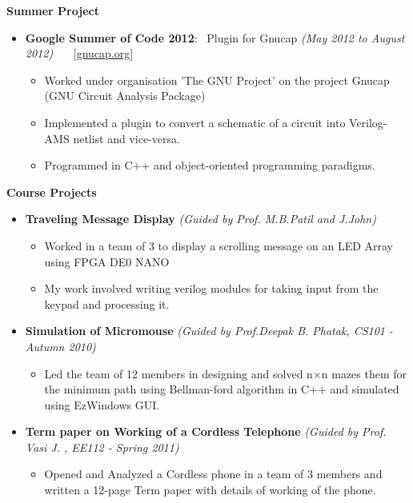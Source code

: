 \documentclass[a4paper,10pt]{article}
\newcommand{\isep}{-2 pt}
\newcommand{\resheading}[1]{{\small \colorbox{mygrey}{\begin{minipage}{0.975\textwidth}{\textbf{#1 \vphantom{p\^{E}}}}\end{minipage}}}}
\begin{document}
\resheading{\textbf{\large Summer Project}}
\begin{itemize}
    \item \textbf{Google Summer of Code 2012}: \ Plugin for Gnucap \emph{(May 2012 to August 2012)} \ \ \ [\url{gnucap.org}]\\[-0.6cm]
    \begin{itemize}
        \item Worked under organisation 'The GNU Project' on the project Gnucap (GNU Circuit Analysis Package)\\[-0.6cm]
        \item Implemented a plugin to convert a schematic of a circuit into Verilog-AMS netlist and vice-versa.\\[-0.6cm]
       \item Programmed in C++ and object-oriented programming paradigms.\\[-0.5cm]
    \end{itemize}
\end{itemize}

\resheading{\textbf{\large Course Projects}}
\begin{itemize}
\item \textbf{Traveling Message Display} \emph{(Guided by Prof. M.B.Patil and J.John)}\\[-0.6cm]
    \begin{itemize}
        \item Worked in a team of 3 to display a scrolling message on an LED Array using FPGA DE0 NANO\\[-0.6cm]
        \item My work involved writing verilog modules for taking input from the keypad and processing it.\\[-0.6cm]
    \end{itemize}
\item \textbf{Simulation of Micromouse} \emph{(Guided by Prof.Deepak B. Phatak, CS101 - Autumn 2010)}\\[-0.7cm]
	\begin{itemize}
	    \item Led the team of 12 members in designing and solved n$\times$n mazes them for the minimum path using Bellman-ford algorithm in C++ and simulated using EzWindows GUI.\\[-0.6cm]
	\end{itemize} 
\item \textbf{Term paper on Working of a Cordless Telephone} \emph{(Guided by Prof. Vasi J. , EE112 - Spring 2011)\\[-0.7cm]}
	\begin{itemize} \itemsep \isep
	  \item Opened and Analyzed a Cordless phone in a team of 3 members and written a 12-page Term paper with details of working of the phone.
	  \end{itemize}
\end{itemize}
\end{document}

